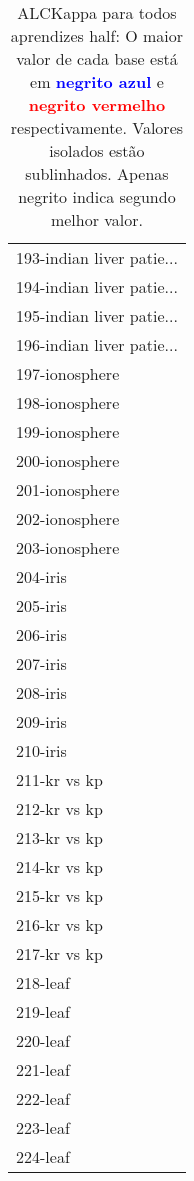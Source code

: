 \begin{table}[h]
\caption{ALCKappa para todos aprendizes half: O maior valor de cada base está em \textcolor{blue}{\textbf{negrito azul}} e \textcolor{red}{\textbf{negrito vermelho}} respectivamente. Valores isolados estão sublinhados. Apenas negrito indica segundo melhor valor.}
\begin{center}\begin{tabular}{l}
 & \\ \hline 193-indian liver patie... &  \\
194-indian liver patie... &  \\
195-indian liver patie... &  \\
196-indian liver patie... &  \\
197-ionosphere &  \\
198-ionosphere &  \\
199-ionosphere &  \\ \hline
200-ionosphere &  \\
201-ionosphere &  \\
202-ionosphere &  \\
203-ionosphere &  \\
204-iris &  \\
205-iris &  \\
206-iris &  \\ \hline
207-iris &  \\
208-iris &  \\
209-iris &  \\
210-iris &  \\
211-kr vs kp &  \\
212-kr vs kp &  \\
213-kr vs kp &  \\ \hline
214-kr vs kp &  \\
215-kr vs kp &  \\
216-kr vs kp &  \\
217-kr vs kp &  \\
218-leaf &  \\
219-leaf &  \\
220-leaf &  \\ \hline
221-leaf &  \\
222-leaf &  \\
223-leaf &  \\
224-leaf &  \\\end{tabular}\label{stratsALCKappa6AllReduxb}
\end{center}
\end{table}
